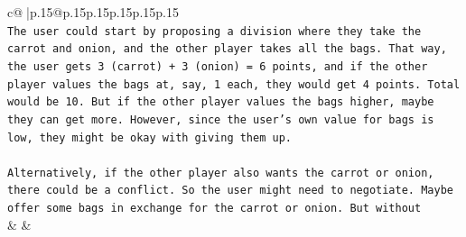 \documentclass{article}
\begin{document}
{\begin{supertabular}{c@{$\;$}|p{.15\linewidth}@{}p{.15\linewidth}p{.15\linewidth}p{.15\linewidth}p{.15\linewidth}p{.15\linewidth}}
{{{\\ 
\texttt{The user could start by proposing a division where they take the carrot and onion, and the other player takes all the bags. That way, the user gets 3 (carrot) + 3 (onion) = 6 points, and if the other player values the bags at, say, 1 each, they would get 4 points. Total would be 10. But if the other player values the bags higher, maybe they can get more. However, since the user's own value for bags is low, they might be okay with giving them up.} \\
\\ 
\texttt{Alternatively, if the other player also wants the carrot or onion, there could be a conflict. So the user might need to negotiate. Maybe offer some bags in exchange for the carrot or onion. But without} \\
            }
        }
    }
    & & \\ \\


\end{supertabular}}
\end{document}

